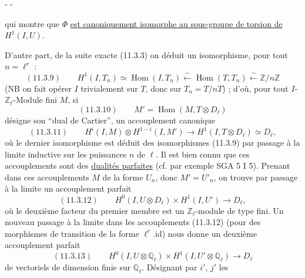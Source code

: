 \begin{center}-  -\end{center}

qui montre que $\Phi$ \uline{est canoniquement isomorphe au sous-groupe de torsion de} $H^1(I,U)$.

D'autre part, de la suite exacte (11.3.3) on déduit un isomorphisme, pour tout $n=\ell^r$ :
\[
(11.3.9)\qquad H^1(I,T_n)\simeq\operatorname{Hom}(I,T_n)\xleftarrow{\sim}\operatorname{Hom}(T,T_n)\xleftarrow{\sim}\mathbb Z/n\mathbb Z
\]
(NB on fait opérer $I$ trivialement sur $T$, donc sur $T_n=T/nT$) ; d'où, pour tout $I$-$\mathbb Z_\ell$-Module fini $M$, si
\[
(11.3.10)\qquad M'=\operatorname{Hom}(M,T\otimes D_\ell)
\]
désigne son ``dual de Cartier'', un accouplement canonique
\[
(11.3.11)\qquad H^i(I,M)\otimes H^{1-i}(I,M')\longrightarrow H^1(I,T\otimes D_\ell)\simeq D_\ell,
\]
où le dernier isomorphisme est déduit des isomorphismes (11.3.9) par passage à la limite inductive sur les puissances $n$ de $\ell$. Il est bien connu que ces accouplements sont des \uline{dualités parfaites} (cf. par exemple SGA 5 I 5). Prenant dans ces accouplements $M$ de la forme $U_n$, donc $M'=U'_n$, on trouve par passage à la limite un accouplement parfait
\[
(11.3.12)\qquad H^0(I,U\otimes D_\ell)\times H^1(I,U')\longrightarrow D_\ell,
\]
où le deuxième facteur du premier membre est un $\mathbb Z_\ell$-module de type fini. Un nouveau passage à la limite dans les accouplements (11.3.12) (pour des morphismes de transition de la forme $\ell^r.\mathrm{id}$) nous donne un deuxième accouplement parfait
\[
(11.3.13)\qquad H^0(I,U\otimes\mathbb Q_\ell)\times H^1(I,U'\otimes\mathbb Q_\ell)\longrightarrow D_\ell
\]
de vectoriels de dimension finie sur $\mathbb Q_\ell$. Désignant par $i'$, $j'$ les


